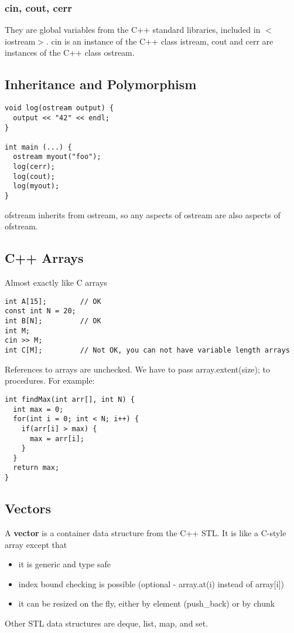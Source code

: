 \documentclass[12pt]{article}
\begin{document}
\subsubsection*{cin, cout, cerr}
They are global variables from the C++ standard libraries, included in $<$iostream$>$. cin is an instance of the C++ class istream, cout and cerr are instances of the C++ class ostream.

\subsection*{Inheritance and Polymorphism}
\begin{verbatim}
void log(ostream output) {
  output << "42" << endl;
}

int main (...) {
  ostream myout("foo");
  log(cerr);
  log(cout);
  log(myout);
}
\end{verbatim}

ofstream inherits from ostream, so any aspects of ostream are also aspects of ofstream.

\subsection*{C++ Arrays}
Almost exactly like C arrays

\begin{verbatim}
int A[15];        // OK
const int N = 20;
int B[N];         // OK
int M;
cin >> M;
int C[M];         // Not OK, you can not have variable length arrays
\end{verbatim}

References to arrays are unchecked. We have to pass array.extent(size); to procedures. For example:
\begin{verbatim}
int findMax(int arr[], int N) {
  int max = 0;
  for(int i = 0; int < N; i++) {
    if(arr[i] > max) {
      max = arr[i];
    }
  }
  return max;
}
\end{verbatim}

\subsection*{Vectors}
A {\bf vector} is a container data structure from the C++ STL. It is like a C-style array except that
\begin{itemize}
\item it is generic and type safe
\item index bound checking is possible (optional - array.at(i) instead of array[i])
\item it can be resized on the fly, either by element (push\_back) or by chunk
\end{itemize}
Other STL data structures are deque, list, map, and set.
\end{document}
